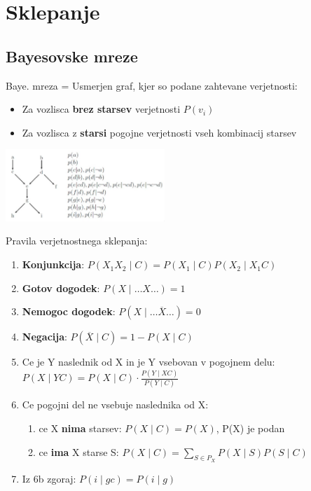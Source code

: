 \section{Sklepanje}

\subsection{Bayesovske mreze}

Baye. mreza = Usmerjen graf, kjer so podane zahtevane verjetnosti:
\begin{itemize}[leftmargin=*,topsep=0pt,noitemsep]
    \item Za vozlisca \textbf{brez starsev} verjetnosti $P(v_i)$
    \item Za vozlisca z \textbf{starsi} pogojne verjetnosti vseh kombinacij starsev
\end{itemize}

\includegraphics[width=6cm]{images/bayesovska_mreza.png}

Pravila verjetnostnega sklepanja:
\begin{enumerate}[leftmargin=*,topsep=0pt,noitemsep]
    \item \textbf{Konjunkcija}: $P(X_1 X_2 \mid C) = P(X_1 \mid C) P(X_2 \mid X_1C)$
    \item \textbf{Gotov dogodek}: $P(X \mid \dots X \dots) = 1$
    \item \textbf{Nemogoc dogodek}: $P(X\mid \dots \overline{X} \dots) = 0$
    \item \textbf{Negacija}: $P(\overline{X} \mid C) = 1 - P(X \mid C)$
    \item Ce je Y naslednik od X in je Y vsebovan v pogojnem delu: $P(X\mid YC) = P(X\mid C) \cdot \frac{P(Y\mid XC)}{P(Y\mid C)}$
    \item Ce pogojni del ne vsebuje naslednika od X:
        \begin{enumerate}[leftmargin=0.1cm,noitemsep,topsep=0pt,label=(\alph*)]
            \item ce X \textbf{nima} starsev: $P(X\mid C) = P(X)$, P(X) je podan
            \item ce \textbf{ima} X starse S: $P(X\mid C) = \sum_{S\in P_X} P(X \mid S)P(S\mid C)$
        \end{enumerate}
    \item Iz 6b zgoraj: $P(i \mid gc) = P(i \mid g)$
\end{enumerate}

